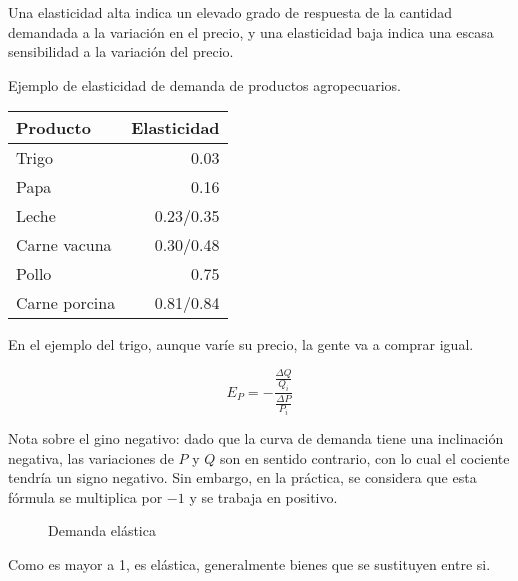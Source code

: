 Una elasticidad alta indica un elevado grado de respuesta de la cantidad demandada a la variación en el precio,
y una elasticidad baja indica una escasa sensibilidad a la variación del precio.

Ejemplo de elasticidad de demanda de productos agropecuarios.

\begin{table}[H]
    \centering
    \begin{tabular}{lr}
        \hline
        Producto      & Elasticidad \\
        \hline
        Trigo         & 0.03        \\
        Papa          & 0.16        \\
        Leche         & 0.23/0.35   \\
        Carne vacuna  & 0.30/0.48   \\
        Pollo         & 0.75        \\
        Carne porcina & 0.81/0.84   \\
        \hline
    \end{tabular}
\end{table}

En el ejemplo del trigo,
aunque varíe su precio,
la gente va a comprar igual.

\begin{equation*}
    E_P = -\frac{\frac{\Delta Q}{Q_i}}{\frac{\Delta P}{P_i}}
\end{equation*}

Nota sobre el gino negativo:
dado que la curva de demanda tiene una inclinación negativa,
las variaciones de \(P\) y \(Q\) son en sentido contrario,
con lo cual el cociente tendría un signo negativo.
Sin embargo, en la práctica, se considera que esta fórmula se multiplica por \(-1\)
y se trabaja en positivo.

\begin{figure}[H]
    \centering
    \caption{Demanda elástica}
\end{figure}

Como es mayor a 1, es elástica, generalmente bienes que se sustituyen entre si.

